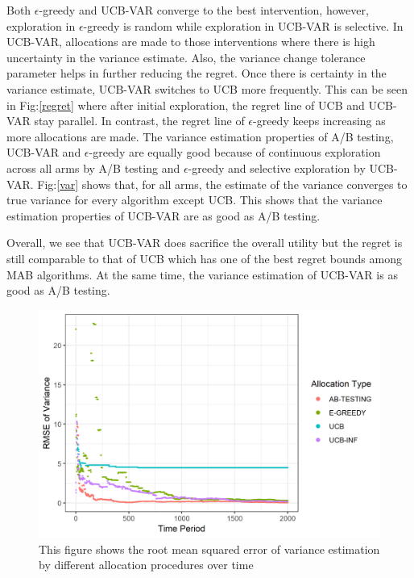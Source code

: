 \documentclass[12pt, letterpaper]{article}
\begin{document}
Both $\epsilon$-greedy and UCB-VAR converge to the best intervention, however, exploration in $\epsilon$-greedy is random while exploration in UCB-VAR is selective. In UCB-VAR, allocations are made to those interventions where there is high uncertainty in the variance estimate. Also, the variance change tolerance parameter helps in further reducing the regret. Once there is certainty in the variance estimate, UCB-VAR switches to UCB more frequently. This can be seen in Fig:\ref{regret} where after initial exploration, the regret line of UCB and UCB-VAR stay parallel. In contrast, the regret line of $\epsilon$-greedy keeps increasing as more allocations are made. The variance estimation properties of A/B testing, UCB-VAR and $\epsilon$-greedy are equally good because of continuous exploration across all arms by A/B testing and $\epsilon$-greedy and selective exploration by UCB-VAR. Fig:\ref{var} shows that, for all arms, the estimate of the variance converges to true variance for every algorithm except UCB. This shows that the variance estimation properties of UCB-VAR are as good as A/B testing.

Overall, we see that UCB-VAR does sacrifice the overall utility but the regret is still comparable to that of UCB which has one of the best regret bounds among MAB algorithms. At the same time, the variance estimation of UCB-VAR is as good as A/B testing. 



\begin{figure}
  \centering
    \includegraphics[width=\textwidth]{figs/var_rmse.png}
      \caption{This figure shows the root mean squared error of variance estimation by different allocation procedures over time}
      \label{var_rmse}
\end{figure}
\end{document}
